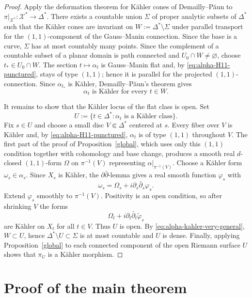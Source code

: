 \documentclass[11pt,letterpaper]{amsart}
\numberwithin{equation}{section}
\newcommand{\cal}{\mathcal}
\def\cX{{\cal X}}
\begin{document}
\begin{proof}
Apply the deformation theorem for K\"ahler cones of Demailly--P\u{a}un
\cite[Theorem 0.9]{DP04} to $\pi|_{\cX^*}:\cX^*\to\Delta^*$. There exists a countable union $\Sigma$ of proper analytic subsets of $\Delta^*$ such that the K\"ahler cones are invariant on
$W:=\Delta^*\setminus\Sigma$ under parallel transport for the
$(1,1)$-component of the Gauss--Manin connection. Since the base is a curve,
$\Sigma$ has at most countably many points. Since the complement of a countable subset of a planar domain is path connected and $U_0\cap W\ne\varnothing$,
choose $t_*\in U_0\cap W$. The section $t\mapsto\alpha_t$ is Gauss--Manin
flat and, by \eqref{eq:alpha-H11-punctured}, stays of type $(1,1)$; hence it is
parallel for the projected $(1,1)$-connection. Since $\alpha_{t_*}$ is
K\"ahler, Demailly--P\u{a}un's theorem gives
\begin{equation}\label{eq:alpha-kahler-very-general}
 \alpha_t\text{ is K\"ahler for every }t\in W.
\end{equation}

It remains to show that the K\"ahler locus of the flat class is open. Set
\[
 U:=\{t\in\Delta^*: \alpha_t\text{ is a K\"ahler class}\}.
\]
Fix $s\in U$ and choose a small disc $V\Subset\Delta^*$ centered at $s$.
Every fiber over $V$ is K\"ahler and, by \eqref{eq:alpha-H11-punctured},
$\alpha_t$ is of type $(1,1)$ throughout $V$. The first part of the proof of
Proposition~\ref{global}, which uses only this $(1,1)$ condition together with
cohomology and base change, produces a smooth real $d$-closed $(1,1)$-form
$\Omega$ on $\pi^{-1}(V)$ representing $\alpha|_{\pi^{-1}(V)}$. Choose a
K\"ahler form $\omega_s\in\alpha_s$. Since $X_s$ is K\"ahler, the
$\partial\bar\partial$-lemma gives a real smooth function $\varphi_s$ with
\[
 \omega_s=\Omega_s+i\partial_s\bar\partial_s\varphi_s.
\]
Extend $\varphi_s$ smoothly to $\pi^{-1}(V)$. Positivity is an open condition,
so after shrinking $V$ the forms
\[
 \Omega_t+i\partial_t\bar\partial_t\widetilde\varphi_s
\]
are K\"ahler on $X_t$ for all $t\in V$. Thus $U$ is open. By
\eqref{eq:alpha-kahler-very-general}, $W\subset U$, hence
$\Delta^*\setminus U\subset\Sigma$ is at most countable and $U$ is dense.
Finally, applying Proposition~\ref{global} to each connected component of the open Riemann surface $U$ shows that $\pi_U$ is a K\"ahler morphism.
\end{proof}


\section{Proof of the main theorem}
\end{document}
